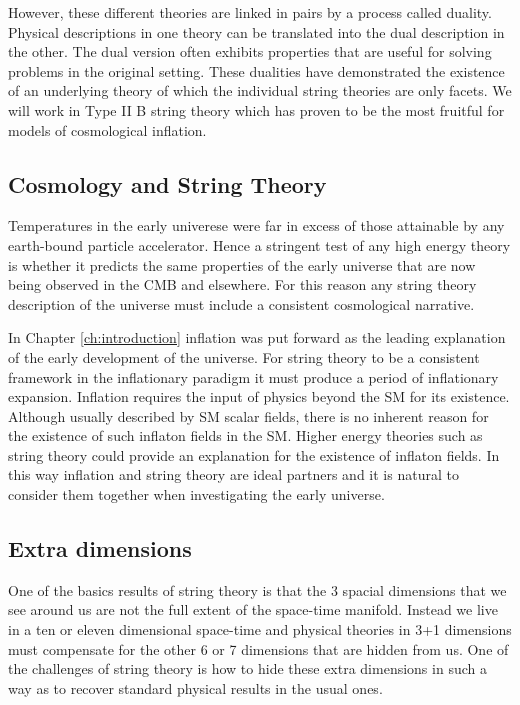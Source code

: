 However, these different theories are linked in pairs by a process called
duality. Physical descriptions in one theory can be translated into the
dual description in the other. The dual version often exhibits properties that
are useful for solving problems in the original setting.
These dualities have demonstrated the existence of an underlying theory of
which the individual string theories are only facets. 
We will work in Type II B string theory which has proven to be the most
fruitful for models of cosmological inflation.
% 

\subsection{Cosmology and String Theory}
Temperatures in the early univerese were far in excess of those attainable by
any earth-bound particle accelerator. Hence a stringent test of any high energy
theory is whether it predicts the same properties of the early universe that are
now being observed in the CMB and elsewhere.
For this reason any string theory description of the universe must include a
consistent cosmological narrative. 

In Chapter \ref{ch:introduction} inflation was put forward as the leading
explanation of the early development of the universe. For string theory to be
a consistent framework in the inflationary paradigm it must produce a period of
inflationary expansion. Inflation requires the input of physics beyond the SM
for its existence. Although usually described by SM scalar fields, there is no
inherent reason for the existence of such inflaton fields in the SM. Higher
energy theories such as string theory could provide an explanation for the
existence of inflaton fields. In this way inflation and string theory are
ideal partners and it is natural to consider them together when investigating
the early universe.


\subsection{Extra dimensions}
One of the basics results of string theory is that the 3 spacial dimensions that we see
around us are not the full extent of the space-time manifold. Instead
we live in a ten or
eleven dimensional space-time and physical theories in 3+1 dimensions must
compensate for the
other 6 or 7 dimensions that are hidden from us. One of the challenges of string theory is how 
to hide these extra dimensions in such a way as to recover standard physical
results in the usual
ones. 

